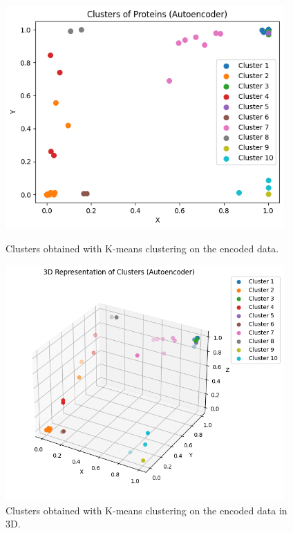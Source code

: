 \begin{figure}[H]
	\centering
	\begin{minipage}[t]{0.48\textwidth}
		\centering
		\includegraphics[width=0.95\textwidth]{../imgs/graphs/clustering/kmeans_autoencoder.png}
		\caption{Clusters obtained with K-means clustering on the encoded data.}
		\label{fig:clusters_autoencoder}
	\end{minipage}\hfill
	\begin{minipage}[t]{0.48\textwidth}
		\centering
		\includegraphics[width=0.95\textwidth]{../imgs/graphs/clustering/kmeans_autoencoder_3d.png}
		\caption{Clusters obtained with K-means clustering on the encoded data in 3D.}
		\label{fig:clusters_autoencoder_3d}
	\end{minipage}
\end{figure}

